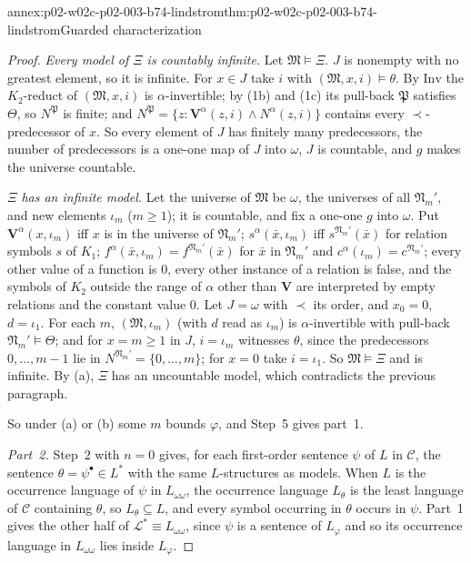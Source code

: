 \begin{annexitem}{annex:p02-w02c-p02-003-b74-lindstrom}{thm:p02-w02c-p02-003-b74-lindstrom}{Guarded characterization}
\begin{proof}
\emph{Every model of \(\Xi\) is countably infinite.}  Let
\(\mathfrak M\models\Xi\).  \(J\) is nonempty with no greatest element, so it
is infinite.  For \(x\in J\) take \(i\) with \((\mathfrak M,x,i)\models
\theta\).  By \(\mathrm{Inv}\) the \(K_2\)-reduct of \((\mathfrak M,x,i)\) is
\(\alpha\)-invertible; by (1b) and (1c) its pull-back \(\mathfrak P\)
satisfies \(\Theta\), so \(N^{\mathfrak P}\) is finite; and
\(N^{\mathfrak P}=\{z:\mathbf V^{\alpha}(z,i)\land N^{\alpha}(z,i)\}\)
contains every \(\prec\)-predecessor of \(x\).  So every element of \(J\) has
finitely many predecessors, the number of predecessors is a one-one map
of \(J\) into \(\omega\), \(J\) is countable, and \(g\) makes the universe
countable.

\emph{\(\Xi\) has an infinite model.}  Let the universe of \(\mathfrak M\)
be \(\omega\), the universes of all \(\mathfrak N_m'\), and new elements
\(\iota_m\) (\(m\geq1\)); it is countable, and fix a one-one \(g\) into
\(\omega\).  Put \(\mathbf V^{\alpha}(x,\iota_m)\) iff \(x\) is in the
universe of \(\mathfrak N_m'\); \(s^{\alpha}(\bar x,\iota_m)\) iff
\(s^{\mathfrak N_m'}(\bar x)\) for relation symbols \(s\) of \(K_1\);
\(f^{\alpha}(\bar x,\iota_m)=f^{\mathfrak N_m'}(\bar x)\) for \(\bar x\) in
\(\mathfrak N_m'\) and \(c^{\alpha}(\iota_m)=c^{\mathfrak N_m'}\); every other
value of a function is \(0\), every other instance of a relation is false,
and the symbols of \(K_2\) outside the range of \(\alpha\) other than
\(\mathbf V\) are interpreted by empty relations and the constant value
\(0\).  Let \(J=\omega\) with \(\prec\) its order, and \(x_0=0\), \(d=\iota_1\).
For each \(m\), \((\mathfrak M,\iota_m)\) (with \(d\) read as \(\iota_m\)) is
\(\alpha\)-invertible with pull-back \(\mathfrak N_m'\models\Theta\); and for
\(x=m\geq1\) in \(J\), \(i=\iota_m\) witnesses \(\theta\), since the
predecessors \(0,\ldots,m-1\) lie in \(N^{\mathfrak N_m'}=\{0,\ldots,m\}\);
for \(x=0\) take \(i=\iota_1\).  So \(\mathfrak M\models\Xi\) and is
infinite.  By (a), \(\Xi\) has an uncountable model, which contradicts the
previous paragraph.

So under (a) or (b) some \(m\) bounds \(\varphi\), and Step~5 gives part~1.

\emph{Part~2.}  Step~2 with \(n=0\) gives, for each first-order sentence
\(\psi\) of \(L\) in \(\mathcal C\), the sentence \(\theta=\psi^{\bullet}\in
L^{\ast}\) with the same \(L\)-structures as models.  When \(L\) is the
occurrence language of \(\psi\) in \(L_{\omega\omega}\), the occurrence
language \(L_\theta\) is the least language of \(\mathcal C\) containing
\(\theta\), so \(L_\theta\subseteq L\), and every symbol occurring in
\(\theta\) occurs in \(\psi\).  Part~1 gives the other half of
\(\mathcal L^{\ast}\equiv L_{\omega\omega}\), since \(\psi\) is a sentence of
\(L_\varphi\) and so its occurrence language in \(L_{\omega\omega}\) lies
inside \(L_\varphi\).
\end{proof}
\end{annexitem}

